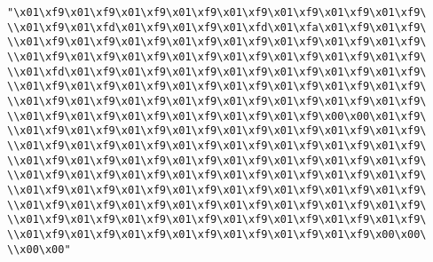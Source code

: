 \verb|"\x01\xf9\x01\xf9\x01\xf9\x01\xf9\x01\xf9\x01\xf9\x01\xf9\x01\xf9\|\newline
\verb|\\x01\xf9\x01\xfd\x01\xf9\x01\xf9\x01\xfd\x01\xfa\x01\xf9\x01\xf9\|\newline
\verb|\\x01\xf9\x01\xf9\x01\xf9\x01\xf9\x01\xf9\x01\xf9\x01\xf9\x01\xf9\|\newline
\verb|\\x01\xf9\x01\xf9\x01\xf9\x01\xf9\x01\xf9\x01\xf9\x01\xf9\x01\xf9\|\newline
\verb|\\x01\xfd\x01\xf9\x01\xf9\x01\xf9\x01\xf9\x01\xf9\x01\xf9\x01\xf9\|\newline
\verb|\\x01\xf9\x01\xf9\x01\xf9\x01\xf9\x01\xf9\x01\xf9\x01\xf9\x01\xf9\|\newline
\verb|\\x01\xf9\x01\xf9\x01\xf9\x01\xf9\x01\xf9\x01\xf9\x01\xf9\x01\xf9\|\newline
\verb|\\x01\xf9\x01\xf9\x01\xf9\x01\xf9\x01\xf9\x01\xf9\x00\x00\x01\xf9\|\newline
\verb|\\x01\xf9\x01\xf9\x01\xf9\x01\xf9\x01\xf9\x01\xf9\x01\xf9\x01\xf9\|\newline
\verb|\\x01\xf9\x01\xf9\x01\xf9\x01\xf9\x01\xf9\x01\xf9\x01\xf9\x01\xf9\|\newline
\verb|\\x01\xf9\x01\xf9\x01\xf9\x01\xf9\x01\xf9\x01\xf9\x01\xf9\x01\xf9\|\newline
\verb|\\x01\xf9\x01\xf9\x01\xf9\x01\xf9\x01\xf9\x01\xf9\x01\xf9\x01\xf9\|\newline
\verb|\\x01\xf9\x01\xf9\x01\xf9\x01\xf9\x01\xf9\x01\xf9\x01\xf9\x01\xf9\|\newline
\verb|\\x01\xf9\x01\xf9\x01\xf9\x01\xf9\x01\xf9\x01\xf9\x01\xf9\x01\xf9\|\newline
\verb|\\x01\xf9\x01\xf9\x01\xf9\x01\xf9\x01\xf9\x01\xf9\x01\xf9\x01\xf9\|\newline
\verb|\\x01\xf9\x01\xf9\x01\xf9\x01\xf9\x01\xf9\x01\xf9\x01\xf9\x00\x00\|\newline
\verb|\\x00\x00"|\newline
